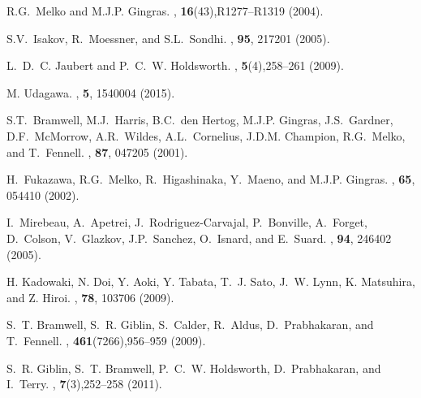 \documentclass[aps,showkeys,groupedaddress]{revtex4}
\begin{document}
\begin{thebibliography}{39}
R.G.~Melko and M.J.P. Gingras.
, {\bf{16}}({43}),{R1277--R1319} {(2004)}.

S.V.~Isakov, R.~Moessner, and S.L.~Sondhi.
, {\bf{95}}, 217201 {(2005)}.

L.~D.~C. Jaubert and P.~C.~W. Holdsworth.
, {\bf{5}}({4}),{258--261} {(2009)}.


M. Udagawa.
, {\bf{5}}, 1540004 {(2015)}.

S.T.~Bramwell, M.J.~Harris, B.C.~den Hertog, M.J.P. Gingras, J.S.~Gardner, D.F.~McMorrow,
  A.R.~Wildes, A.L.~Cornelius, J.D.M. Champion, R.G.~Melko, and T.~Fennell.
, {\bf{87}}, 047205 {(2001)}.

H.~Fukazawa, R.G.~Melko, R.~Higashinaka, Y.~Maeno, and M.J.P. Gingras.
, {\bf{65}}, 054410 {(2002)}.

I.~Mirebeau, A.~Apetrei, J.~Rodriguez-Carvajal, P.~Bonville, A.~Forget, D.~Colson,
  V.~Glazkov, J.P.~Sanchez, O.~Isnard, and E.~Suard.
, {\bf{94}}, 246402 {(2005)}.

H. Kadowaki, N. Doi, Y. Aoki, Y. Tabata, T.~J. Sato,
  J.~W. Lynn, K. Matsuhira, and Z. Hiroi.
, {\bf{78}}, 103706 {(2009)}.

S.~T. Bramwell, S.~R. Giblin, S.~Calder, R.~Aldus, D.~Prabhakaran, and
  T.~Fennell.
, {\bf{461}}({7266}),{956--959} {(2009)}.

S.~R. Giblin, S.~T. Bramwell, P.~C.~W. Holdsworth, D.~Prabhakaran, and
  I.~Terry.
, {\bf{7}}({3}),{252--258} {(2011)}.


\end{thebibliography}
\end{document}
